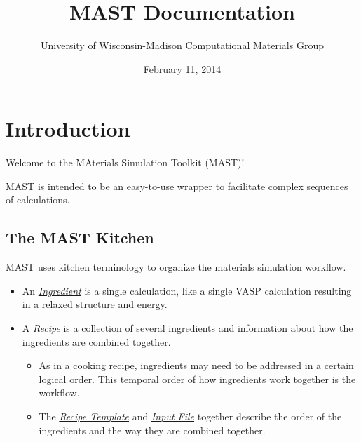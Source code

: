 \documentclass[letterpaper,10pt,english]{sphinxmanual}
\title{MAST Documentation}
\date{February 11, 2014}
\author{University of Wisconsin-Madison Computational Materials Group}
\begin{document}
\maketitle
\tableofcontents
{}\label{index::doc}



\chapter{Introduction}
\label{0_0_introduction:introduction}\label{0_0_introduction::doc}\label{0_0_introduction:materials-simulation-toolkit-mast-manual}
Welcome to the MAterials Simulation Toolkit (MAST)!

MAST is intended to be an easy-to-use wrapper to facilitate complex sequences of calculations.


\section{The MAST Kitchen}
\label{0_0_introduction:the-mast-kitchen}
MAST uses kitchen terminology to organize the materials simulation workflow.
\begin{itemize}
\item {} 
An {\hyperref[2_0_ingredients::doc]{\emph{Ingredient}}} is a single calculation, like a single VASP calculation resulting in a relaxed structure and energy.

\item {} 
A {\hyperref[4_0_recipe::doc]{\emph{Recipe}}} is a collection of several ingredients and information about how the ingredients are combined together.
\begin{itemize}
\item {} 
As in a cooking recipe, ingredients may need to be addressed in a certain logical order. This temporal order of how ingredients work together is the workflow.

\item {} 
The {\hyperref[4_0_recipe::doc]{\emph{Recipe Template}}} and {\hyperref[3_0_inputfile::doc]{\emph{Input File}}} together describe the order of the ingredients and the way they are combined together.

\end{itemize}

\end{itemize}
\end{document}
